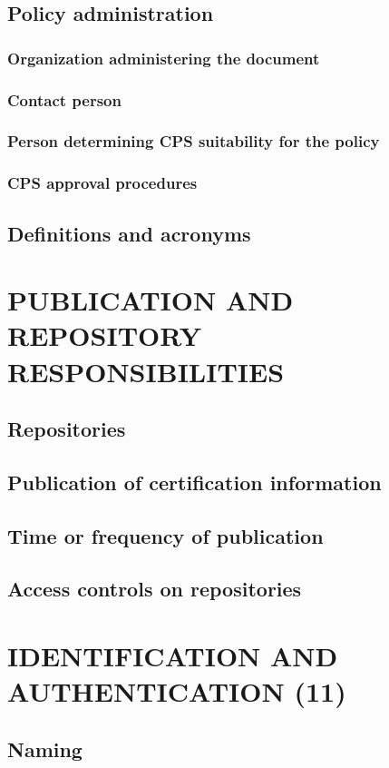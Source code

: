 \documentclass[10pt]{article}
\begin{document}
\subsection{Policy administration}
\subsubsection{Organization administering the document}
\subsubsection{Contact person}
\subsubsection{Person determining CPS suitability for the policy}
\subsubsection{CPS approval procedures}
\subsection{Definitions and acronyms}
\section{PUBLICATION AND REPOSITORY RESPONSIBILITIES}
\subsection{Repositories}
\subsection{Publication of certification information}
\subsection{Time or frequency of publication}
\subsection{Access controls on repositories}
\section{IDENTIFICATION AND AUTHENTICATION (11)}
\subsection{Naming}
\end{document}
